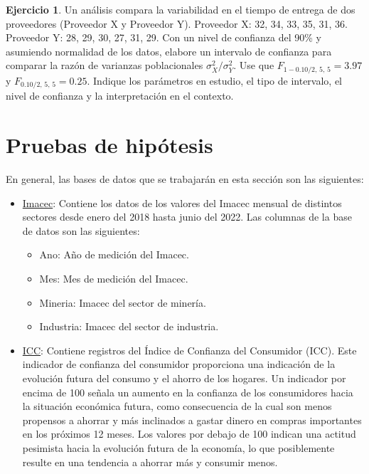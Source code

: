 \documentclass[
  11pt,
]{book}
\providecommand{\tightlist}{%
  \setlength{\itemsep}{0pt}\setlength{\parskip}{0pt}}
\theoremstyle{definition}
\theoremstyle{definition}
\theoremstyle{definition}
\newtheorem{exercise}{Ejercicio}[chapter]
\theoremstyle{definition}
\theoremstyle{remark}
\begin{document}
\begin{exercise}
Un análisis compara la variabilidad en el tiempo de entrega de dos proveedores (Proveedor X y Proveedor Y). Proveedor X: 32, 34, 33, 35, 31, 36. Proveedor Y: 28, 29, 30, 27, 31, 29. Con un nivel de confianza del 90\% y asumiendo normalidad de los datos, elabore un intervalo de confianza para comparar la razón de varianzas poblacionales \(\sigma^2_{X}/\sigma^2_{Y}\). Use que \(F_{1-0.10/2,\,5,\,5} = 3.97\) y \(F_{0.10/2,\,5,\,5} = 0.25\). Indique los parámetros en estudio, el tipo de intervalo, el nivel de confianza y la interpretación en el contexto.
\end{exercise}

\chapter{Pruebas de hipótesis}\label{PH}

En general, las bases de datos que se trabajarán en esta sección son las siguientes:

\begin{itemize}
\item
  \label{Imacec2}\href{https://raw.githubusercontent.com/Dfranzani/Bases-de-datos-para-cursos/main/2022-2/Estad\%C3\%ADstica\%201/imacec.csv}{Imacec}: Contiene los datos de los valores del Imacec mensual de distintos sectores desde enero del 2018 hasta junio del 2022. Las columnas de la base de datos son las siguientes:

  \begin{itemize}
  \tightlist
  \item
    Ano: Año de medición del Imacec.
  \item
    Mes: Mes de medición del Imacec.
  \item
    Mineria: Imacec del sector de minería.
  \item
    Industria: Imacec del sector de industria.
  \end{itemize}
\item
  \label{ICC}\href{https://raw.githubusercontent.com/Dfranzani/Bases-de-datos-para-cursos/main/2022-2/Estad\%C3\%ADstica\%202/consumidor.csv}{ICC}: Contiene registros del Índice de Confianza del Consumidor (ICC). Este indicador de confianza del consumidor proporciona una indicación de la evolución futura del consumo y el ahorro de los hogares. Un indicador por encima de 100 señala un aumento en la confianza de los consumidores hacia la situación económica futura, como consecuencia de la cual son menos propensos a ahorrar y más inclinados a gastar dinero en compras importantes en los próximos 12 meses. Los valores por debajo de 100 indican una actitud pesimista hacia la evolución futura de la economía, lo que posiblemente resulte en una tendencia a ahorrar más y consumir menos.
\end{itemize}
\end{document}
